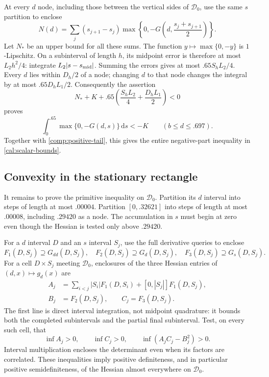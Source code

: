 At every $d$ node, including those between the vertical sides of
$\mathcal D_0$, use the same $s$ partition to enclose
\[
 N(d)=\sum_j(s_{j+1}-s_j)
       \max\left\{0,-G\left(d,\frac{s_j+s_{j+1}}2\right)\right\}.
\]
Let $N_*$ be an upper bound for all these sums.  The function
$y\mapsto\max\{0,-y\}$ is $1$-Lipschitz.  On a subinterval of
length $h$, its midpoint error is therefore at most $L_2h^2/4$:
integrate $L_2|s-s_{\rm mid}|$.  Summing the errors gives at most
$.65S_hL_2/4$.  Every $d$ lies within $D_h/2$ of a node; changing
$d$ to that node changes the integral by at most
$.65D_hL_1/2$.  Consequently the assertion
\begin{equation}\label{comp:negative-assertion}
 N_*+K+.65\left(\frac{S_hL_2}{4}+\frac{D_hL_1}{2}\right)<0
\end{equation}
proves
\[
 \int_0^{.65}\max\{0,-G(d,s)\}\,\mathrm ds<-K
                   \qquad(b\le d\le.697).
\]
Together with \eqref{comp:positive-tail}, this gives the entire
negative-part inequality in \eqref{cal:scalar-bounds}.

\subsection{Convexity in the stationary rectangle}
\label{comp:hessian}

It remains to prove the primitive inequality on $\mathcal D_0$.
Partition its $d$ interval into steps of length at most $.00004$.
Partition $[0,.32621]$ into steps of length at most $.00008$,
including $.29420$ as a node.  The accumulation in $s$ must begin
at zero even though the Hessian is tested only above $.29420$.

For a $d$ interval $D$ and an $s$ interval $S_j$, use the full
derivative queries to enclose
\[
 F_1(D,S_j)\supseteq G_{dd}(D,S_j),\quad
 F_2(D,S_j)\supseteq G_d(D,S_j),\quad
 F_3(D,S_j)\supseteq G_s(D,S_j).
\]
For a cell $D\times S_j$ meeting $\mathcal D_0$, enclosures of
the three Hessian entries of $(d,x)\mapsto g_d(x)$ are
\begin{equation}\label{comp:hessian-entries}
 \begin{split}
 A_j&=\sum_{i<j}|S_i|F_1(D,S_i)
                             +[0,|S_j|]F_1(D,S_j),\\
 B_j&=F_2(D,S_j),\qquad C_j=F_3(D,S_j).
 \end{split}
\end{equation}
The first line is direct interval integration, not midpoint
quadrature: it bounds both the completed subintervals and the
partial final subinterval.  Test, on every such cell, that
\begin{equation}\label{comp:hessian-assertions}
 \inf A_j>0,\qquad \inf C_j>0,\qquad
                         \inf(A_jC_j-B_j^2)>0.
\end{equation}
Interval multiplication encloses the determinant even when its
factors are correlated.  These inequalities imply positive
definiteness, and in particular positive semidefiniteness, of the
Hessian almost everywhere on $\mathcal D_0$.

